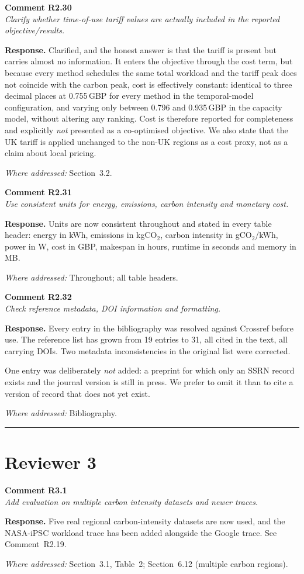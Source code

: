 \documentclass[11pt,a4paper]{article}
\newcommand{\rsp}[1]{\vspace{2pt}\noindent\textbf{Response.} #1\par\vspace{6pt}}
\newcommand{\rwhere}[1]{\noindent\textit{Where addressed:} #1\par\vspace{10pt}}
\newenvironment{revcomment}[1]
  {\begin{tcolorbox}[colback=gray!6,colframe=gray!45,boxrule=0.4pt,
     left=6pt,right=6pt,top=4pt,bottom=4pt]\textbf{#1}\\[2pt]\itshape\color{cmt}}
  {\end{tcolorbox}\vspace{4pt}}
\begin{document}
\begin{revcomment}{Comment R2.30}
Clarify whether time-of-use tariff values are actually included in the reported
objective/results.
\end{revcomment}
\rsp{Clarified, and the honest answer is that the tariff is present but carries
almost no information. It enters the objective through the cost term, but because
every method schedules the same total workload and the tariff peak does not
coincide with the carbon peak, cost is effectively constant: identical to three
decimal places at 0.755\,GBP for every method in the temporal-model configuration,
and varying only between 0.796 and 0.935\,GBP in the capacity model, without
altering any ranking. Cost is therefore reported for completeness and explicitly
\emph{not} presented as a co-optimised objective. We also state that the UK tariff
is applied unchanged to the non-UK regions as a cost proxy, not as a claim about
local pricing.}
\rwhere{Section~3.2.}

\begin{revcomment}{Comment R2.31}
Use consistent units for energy, emissions, carbon intensity and monetary cost.
\end{revcomment}
\rsp{Units are now consistent throughout and stated in every table header: energy in
kWh, emissions in kgCO$_2$, carbon intensity in gCO$_2$/kWh, power in W, cost in
GBP, makespan in hours, runtime in seconds and memory in MB.}
\rwhere{Throughout; all table headers.}

\begin{revcomment}{Comment R2.32}
Check reference metadata, DOI information and formatting.
\end{revcomment}
\rsp{Every entry in the bibliography was resolved against Crossref before use. The
reference list has grown from 19 entries to 31, all cited in the text, all carrying
DOIs. Two metadata inconsistencies in the original list were corrected.

One entry was deliberately \emph{not} added: a preprint for which only an SSRN
record exists and the journal version is still in press. We prefer to omit it than
to cite a version of record that does not yet exist.}
\rwhere{Bibliography.}

\bigskip
\hrule
\bigskip

\section{Reviewer 3}

\begin{revcomment}{Comment R3.1}
Add evaluation on multiple carbon intensity datasets and newer traces.
\end{revcomment}
\rsp{Five real regional carbon-intensity datasets are now used, and the NASA-iPSC
workload trace has been added alongside the Google trace. See Comment~R2.19.}
\rwhere{Section~3.1, Table~2; Section~6.12 (multiple carbon regions).}
\end{document}
